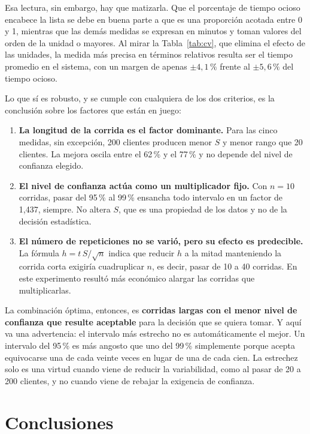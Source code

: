\documentclass[11pt,letterpaper]{article}
\begin{document}
Esa lectura, sin embargo, hay que matizarla. Que el porcentaje de tiempo ocioso encabece la lista se debe en buena parte a que es una proporción acotada entre 0 y 1, mientras que las demás medidas se expresan en minutos y toman valores del orden de la unidad o mayores. Al mirar la Tabla~\ref{tab:cv}, que elimina el efecto de las unidades, la medida más precisa en términos relativos resulta ser el tiempo promedio en el sistema, con un margen de apenas $\pm 4{,}1\,\%$ frente al $\pm 5{,}6\,\%$ del tiempo ocioso.

Lo que sí es robusto, y se cumple con cualquiera de los dos criterios, es la conclusión sobre los factores que están en juego:

\begin{enumerate}[itemsep=3pt]
    \item \textbf{La longitud de la corrida es el factor dominante.} Para las cinco medidas, sin excepción, 200 clientes producen menor $S$ y menor rango que 20 clientes. La mejora oscila entre el 62\,\% y el 77\,\% y no depende del nivel de confianza elegido.
    \item \textbf{El nivel de confianza actúa como un multiplicador fijo.} Con $n = 10$ corridas, pasar del 95\,\% al 99\,\% ensancha todo intervalo en un factor de 1,437, siempre. No altera $S$, que es una propiedad de los datos y no de la decisión estadística.
    \item \textbf{El número de repeticiones no se varió, pero su efecto es predecible.} La fórmula $h = t\,S/\sqrt{n}$ indica que reducir $h$ a la mitad manteniendo la corrida corta exigiría cuadruplicar $n$, es decir, pasar de 10 a 40 corridas. En este experimento resultó más económico alargar las corridas que multiplicarlas.
\end{enumerate}

La combinación óptima, entonces, es \textbf{corridas largas con el menor nivel de confianza que resulte aceptable} para la decisión que se quiera tomar. Y aquí va una advertencia: el intervalo más estrecho no es automáticamente el mejor. Un intervalo del 95\,\% es más angosto que uno del 99\,\% simplemente porque acepta equivocarse una de cada veinte veces en lugar de una de cada cien. La estrechez solo es una virtud cuando viene de reducir la variabilidad, como al pasar de 20 a 200 clientes, y no cuando viene de rebajar la exigencia de confianza.

\section{Conclusiones}
\end{document}
